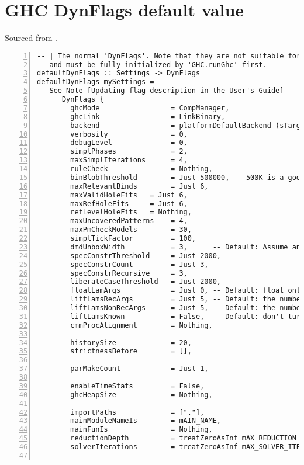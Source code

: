 \documentclass[en]{pracamgr}
\begin{document}
\chapter{GHC DynFlags default value}\label{appendix:defval}
Sourced from \cite{GHCDynFlagsDefault}.
\begin{lstlisting}[numbers=left,stepnumber=1]
-- | The normal 'DynFlags'. Note that they are not suitable for use in this form
-- and must be fully initialized by 'GHC.runGhc' first.
defaultDynFlags :: Settings -> DynFlags
defaultDynFlags mySettings =
-- See Note [Updating flag description in the User's Guide]
      DynFlags {
        ghcMode                 = CompManager,
        ghcLink                 = LinkBinary,
        backend                 = platformDefaultBackend (sTargetPlatform mySettings),
        verbosity               = 0,
        debugLevel              = 0,
        simplPhases             = 2,
        maxSimplIterations      = 4,
        ruleCheck               = Nothing,
        binBlobThreshold        = Just 500000, -- 500K is a good default (see #16190)
        maxRelevantBinds        = Just 6,
        maxValidHoleFits   = Just 6,
        maxRefHoleFits     = Just 6,
        refLevelHoleFits   = Nothing,
        maxUncoveredPatterns    = 4,
        maxPmCheckModels        = 30,
        simplTickFactor         = 100,
        dmdUnboxWidth           = 3,      -- Default: Assume an unboxed demand on function bodies returning a triple
        specConstrThreshold     = Just 2000,
        specConstrCount         = Just 3,
        specConstrRecursive     = 3,
        liberateCaseThreshold   = Just 2000,
        floatLamArgs            = Just 0, -- Default: float only if no fvs
        liftLamsRecArgs         = Just 5, -- Default: the number of available argument hardware registers on x86_64
        liftLamsNonRecArgs      = Just 5, -- Default: the number of available argument hardware registers on x86_64
        liftLamsKnown           = False,  -- Default: don't turn known calls into unknown ones
        cmmProcAlignment        = Nothing,

        historySize             = 20,
        strictnessBefore        = [],

        parMakeCount            = Just 1,

        enableTimeStats         = False,
        ghcHeapSize             = Nothing,

        importPaths             = ["."],
        mainModuleNameIs        = mAIN_NAME,
        mainFunIs               = Nothing,
        reductionDepth          = treatZeroAsInf mAX_REDUCTION_DEPTH,
        solverIterations        = treatZeroAsInf mAX_SOLVER_ITERATIONS,


\end{lstlisting}
\end{document}
